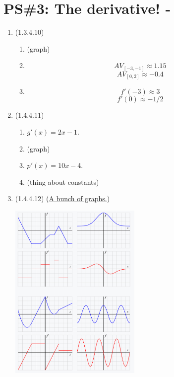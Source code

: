 


%


\allowdisplaybreaks
\section{PS\#3: The derivative! -  }


\everymath{\displaystyle}
\begin{enumerate}[leftmargin=0pt]

\item (1.3.4.10)
\begin{enumerate}
    \item (graph)
    \item \[AV_{[-3, -1]} \approx 1.15\] \[AV_{[0,2]} \approx -0.4\]
    \item \[f'(-3) \approx 3\] \[f'(0) \approx -1/2\]
\end{enumerate}

\item (1.4.4.11)
\begin{enumerate}
    \item $g'(x) = 2x - 1$.
    \item (graph)
    \item $p'(x)= 10x - 4$.
    \item (thing about constants)
\end{enumerate}

\item (1.4.4.12) (\href{https://activecalculus.org/single/exercises-answers.html}{A bunch of graphs.})

\includegraphics[width=0.5\textwidth]{../images/derivative-graphs.png}


\end{enumerate}
